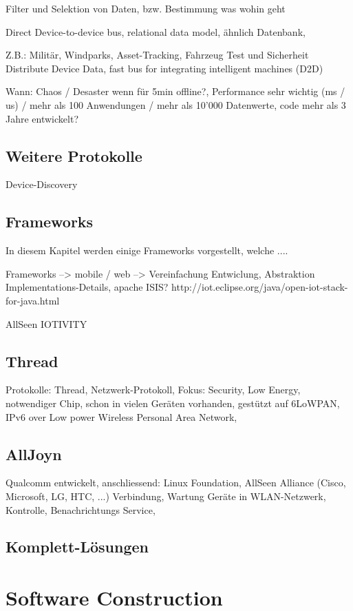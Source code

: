 Filter und Selektion von Daten, bzw. Bestimmung was wohin geht

Direct Device-to-device bus, relational data model, ähnlich Datenbank, 

Z.B.: Militär, Windparks, Asset-Tracking, Fahrzeug Test und Sicherheit
 Distribute Device Data, fast bus for integrating intelligent machines (D2D)

Wann: Chaos / Desaster wenn für 5min offline?, Performance sehr wichtig (ms / us) / mehr als 100 Anwendungen / mehr als 10'000 Datenwerte, code mehr als 3 Jahre entwickelt?

\subsection{Weitere Protokolle}
Device-Discovery

\subsection{Frameworks}
In diesem Kapitel werden einige Frameworks vorgestellt, welche ....

Frameworks --> mobile / web --> Vereinfachung Entwiclung, Abstraktion Implementations-Details, 
apache ISIS?
http://iot.eclipse.org/java/open-iot-stack-for-java.html

AllSeen
IOTIVITY

\subsection{Thread}
Protokolle: Thread, Netzwerk-Protokoll, Fokus: Security, Low Energy, notwendiger Chip, schon in vielen Geräten vorhanden, gestützt auf 6LoWPAN, IPv6 over Low power Wireless Personal Area Network, 


\subsection{AllJoyn}
Qualcomm entwickelt, anschliessend: Linux Foundation, AllSeen Alliance (Cisco, Microsoft, LG, HTC, ...)
Verbindung, Wartung Geräte in WLAN-Netzwerk, Kontrolle, Benachrichtungs Service, 


\subsection{Komplett-Lösungen}



\section{Software Construction} 

